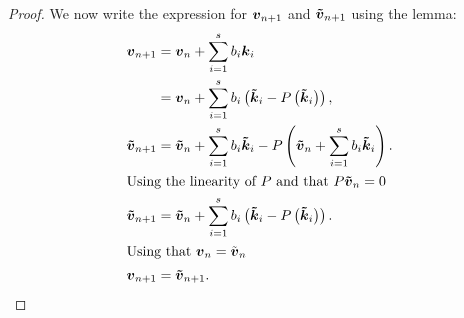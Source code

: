 \begin{proof}
We now write the expression for ${\boldsymbol {v}}_{n+1}$ and ${\boldsymbol {\tilde{v}}}_{n+1}$ using the lemma:
\begin{align*}
{\boldsymbol {v}}_{n+1}&={\boldsymbol {v}}_{n}+\sum_{i=1}^{s}b_{i}{\boldsymbol {k}}_{i}\\
&={\boldsymbol {v}}_{n}+\sum_{i=1}^{s}b_{i}\left({\boldsymbol {\tilde{k}}}_{i}-P\left({\boldsymbol {\tilde{k}}}_{i}\right)\right),\\
{\boldsymbol {\tilde{v}}}_{n+1}&={\boldsymbol {\tilde{v}}}_{n}+\sum_{i=1}^{s}b_{i}{\boldsymbol {\tilde{k}}}_{i}-P\left({\boldsymbol {\tilde{v}}}_{n}+\sum_{i=1}^{s}b_{i}{\boldsymbol {\tilde{k}}}_{i}\right).\\
\intertext{Using the linearity of $P$ and that $P{\boldsymbol {\tilde{v}}}_{n}=0$}
{\boldsymbol {\tilde{v}}}_{n+1}&={\boldsymbol {\tilde{v}}}_{n}+\sum_{i=1}^{s}b_{i}\left({\boldsymbol {\tilde{k}}}_{i}-P\left({\boldsymbol {\tilde{k}}}_{i}\right)\right).\\
\intertext{Using that ${\boldsymbol {v}}_{n}=\tilde{{\boldsymbol {v}}}_{n}$}
{\boldsymbol {v}}_{n+1}&={\boldsymbol {\tilde{v}}}_{n+1}.
\end{align*}

\end{proof}

